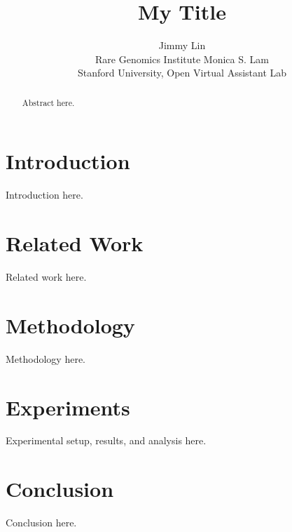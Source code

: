 \documentclass{article} %
\title{My Title}
\author{Jimmy Lin \\
Rare Genomics Institute
\And
Monica S. Lam \\
Stanford University, Open Virtual Assistant Lab
}
\begin{document}
\maketitle

\begin{abstract}
Abstract here.
\end{abstract}

\section{Introduction}
\label{sec:intro}
Introduction here.

\section{Related Work}
\label{sec:related_work}
Related work here.

\section{Methodology}
\label{sec:method}
Methodology here.

\section{Experiments}
\label{sec:experiments}
Experimental setup, results, and analysis here.

\section{Conclusion}
\label{sec:conclusion}
Conclusion here.




\end{document}
